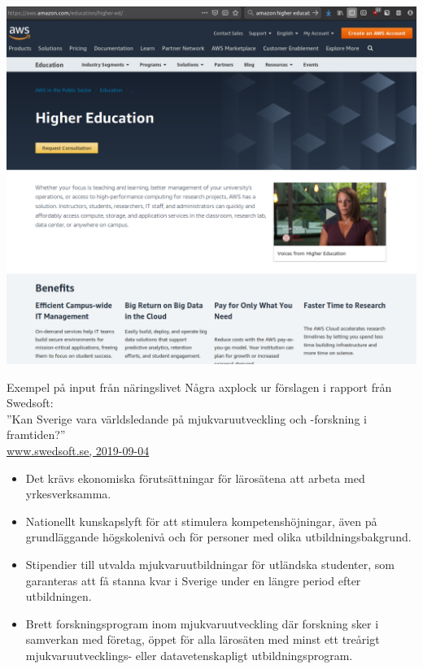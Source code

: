 \documentclass[aspectratio=169]{beamer}
\newenvironment{Slide}[1]%
  {\begin{frame}[environment=Slide]{#1}}
  {\end{frame}}%
\begin{document}
\begin{frame}[plain]
\includegraphics[height=1.3\textheight]{../img/aws}
\end{frame}


\begin{Slide}{Exempel på input från näringslivet}
  Några axplock ur förslagen i rapport från Swedsoft: \\''Kan Sverige vara världsledande på mjukvaruutveckling och -forskning i framtiden?''\\
  \href{https://www.swedsoft.se/wp-content/uploads/sites/7/2019/09/Swedsoft-Helhetssyn-p\%C3\%A5-mjukvarans-betydelse-f\%C3\%B6r-digitalisering-och-konkurrenskraft.pdf}{www.swedsoft.se, 2019-09-04}
\begin{itemize}
  \item Det krävs ekonomiska förutsättningar för lärosätena att arbeta med yrkesverksamma.
  \item Nationellt kunskapslyft för att stimulera kompetenshöjningar, även på grundläggande högskolenivå och för personer med olika utbildningsbakgrund.
  \item Stipendier till utvalda mjukvaruutbildningar för utländska studenter, som garanteras att få stanna kvar i Sverige under en längre period efter utbildningen.
  \item Brett forskningsprogram inom mjukvaruutveckling där forskning sker i samverkan med företag, öppet för alla lärosäten med minst ett treårigt mjukvaruutvecklings- eller datavetenskapligt utbildningsprogram.
\end{itemize}
\end{Slide}
\end{document}
